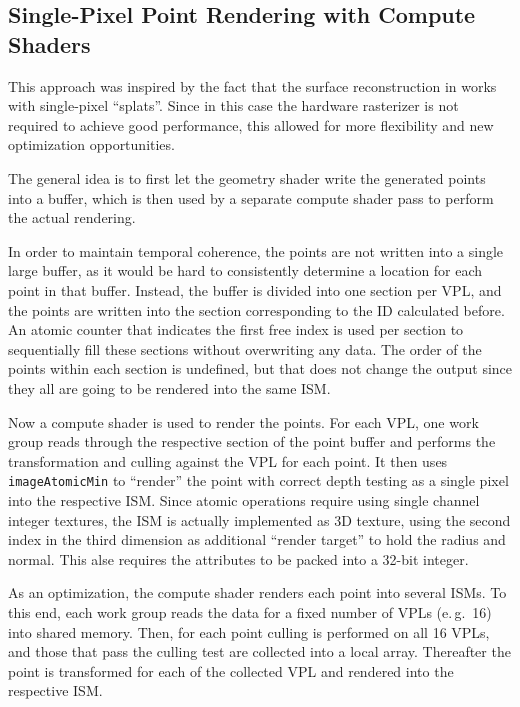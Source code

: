 \subsection{Single-Pixel Point Rendering with Compute Shaders}

This approach was inspired by the fact that the surface reconstruction in \citet{Marroquim:2007:reconstruction} works with single-pixel ``splats''. Since in this case the hardware rasterizer is not required to achieve good performance, this allowed for more flexibility and new optimization opportunities.

The general idea is to first let the geometry shader write the generated points into a buffer, which is then used by a separate compute shader pass to perform the actual rendering.

In order to maintain temporal coherence, the points are not written into a single large buffer, as it would be hard to consistently determine a location for each point in that buffer. Instead, the buffer is divided into one section per VPL, and the points are written into the section corresponding to the ID calculated before. An atomic counter that indicates the first free index is used per section to sequentially fill these sections without overwriting any data. The order of the points within each section is undefined, but that does not change the output since they all are going to be rendered into the same ISM.

Now a compute shader is used to render the points. For each VPL, one work group reads through the respective section of the point buffer and performs the transformation and culling against the VPL for each point. It then uses \texttt{imageAtomicMin} to ``render'' the point with correct depth testing as a single pixel into the respective ISM. Since atomic operations require using single channel integer textures, the ISM is actually implemented as 3D texture, using the second index in the third dimension as additional ``render target'' to hold the radius and normal. This alse requires the attributes to be packed into a 32-bit integer.

As an optimization, the compute shader renders each point into several ISMs. To this end, each work group reads the data for a fixed number of VPLs (e.\,g.\ 16) into shared memory. Then, for each point culling is performed on all 16 VPLs, and those that pass the culling test are collected into a local array. Thereafter the point is transformed for each of the collected VPL and rendered into the respective ISM.

